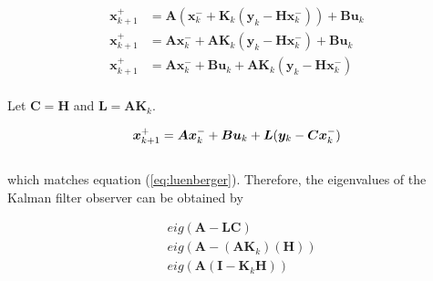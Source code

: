 \documentclass[10pt,conference,compsoc]{IEEEtran}
\newcommand{\mtx}[1] {\bm #1}
\begin{document}
\begin{align*}
  \mtx{x}_{k+1}^+ &= \mtx{A} (\mtx{x}_k^- +
    \mtx{K}_k (\mtx{y}_k - \mtx{H} \mtx{x}_k^-)) + \mtx{B} \mtx{u}_k \\
  \mtx{x}_{k+1}^+ &= \mtx{A} \mtx{x}_k^- +
    \mtx{A} \mtx{K}_k (\mtx{y}_k - \mtx{H} \mtx{x}_k^-) + \mtx{B} \mtx{u}_k \\
  \mtx{x}_{k+1}^+ &= \mtx{A} \mtx{x}_k^- + \mtx{B} \mtx{u}_k +
    \mtx{A} \mtx{K}_k (\mtx{y}_k - \mtx{H} \mtx{x}_k^-) \\
\end{align*}

Let $\mtx{C} = \mtx{H}$ and $\mtx{L} = \mtx{A} \mtx{K}_k$.

\begin{equation} \label{eq:app_kalman_leunberger}
  \mtx{x}_{k+1}^+ = \mtx{A} \mtx{x}_k^- + \mtx{B} \mtx{u}_k +
    \mtx{L} (\mtx{y}_k - \mtx{C} \mtx{x}_k^-) \\
\end{equation}
\\
which matches equation (\ref{eq:luenberger}). Therefore, the eigenvalues of the
Kalman filter observer can be obtained by

\begin{align}
  &eig(\mtx{A} - \mtx{L}\mtx{C}) \nonumber \\
  &eig(\mtx{A} - (\mtx{A}\mtx{K}_k)(\mtx{H})) \nonumber \\
  &eig(\mtx{A}(\mtx{I} - \mtx{K}_k\mtx{H}))
\end{align}



\glsaddall
\printglossaries
\end{document}
